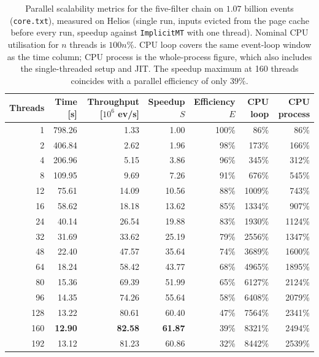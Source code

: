 \begin{table}[htbp]
\centering
\caption{Parallel scalability metrics for the five-filter chain on $1.07$ billion events (\texttt{core.txt}), measured on Helios (single run, inputs evicted from the page cache before every run, speedup against \texttt{ImplicitMT} with one thread). Nominal CPU utilisation for $n$ threads is $100n\%$. CPU loop covers the same event-loop window as the time column; CPU process is the whole-process figure, which also includes the single-threaded setup and JIT. The speedup maximum at 160 threads coincides with a parallel efficiency of only $39\%$.}
\label{tab:scalability-chain}
\begin{tabular}{rrrrrrr}
\toprule
Threads & Time [s] & Throughput [$10^6$ ev/s] & Speedup $S$ & Efficiency $E$ & CPU loop & CPU process \\
\midrule
 1 & 798.26 & 1.33 & 1.00 & 100\% & 86\% & 86\% \\
 2 & 406.84 & 2.62 & 1.96 & 98\% & 173\% & 166\% \\
 4 & 206.96 & 5.15 & 3.86 & 96\% & 345\% & 312\% \\
 8 & 109.95 & 9.69 & 7.26 & 91\% & 676\% & 545\% \\
12 & 75.61 & 14.09 & 10.56 & 88\% & 1009\% & 743\% \\
16 & 58.62 & 18.18 & 13.62 & 85\% & 1334\% & 907\% \\
24 & 40.14 & 26.54 & 19.88 & 83\% & 1930\% & 1124\% \\
32 & 31.69 & 33.62 & 25.19 & 79\% & 2556\% & 1347\% \\
48 & 22.40 & 47.57 & 35.64 & 74\% & 3689\% & 1600\% \\
64 & 18.24 & 58.42 & 43.77 & 68\% & 4965\% & 1895\% \\
80 & 15.36 & 69.39 & 51.99 & 65\% & 6127\% & 2124\% \\
96 & 14.35 & 74.26 & 55.64 & 58\% & 6408\% & 2079\% \\
128 & 13.22 & 80.61 & 60.40 & 47\% & 7564\% & 2341\% \\
160 & \textbf{12.90} & \textbf{82.58} & \textbf{61.87} & 39\% & 8321\% & 2494\% \\
192 & 13.12 & 81.23 & 60.86 & 32\% & 8442\% & 2539\% \\
\bottomrule
\end{tabular}
\end{table}
